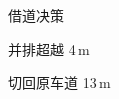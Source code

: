 \begin{subfigure}[b]{\textwidth}
  \centering
  
  \caption{借道决策}
\end{subfigure}

\begin{subfigure}[b]{\textwidth}
  \centering
  
  \caption{并排超越 4\,m}
\end{subfigure}

\begin{subfigure}[b]{\textwidth}
  \centering
  
  \caption{切回原车道 13\,m}
\end{subfigure}
